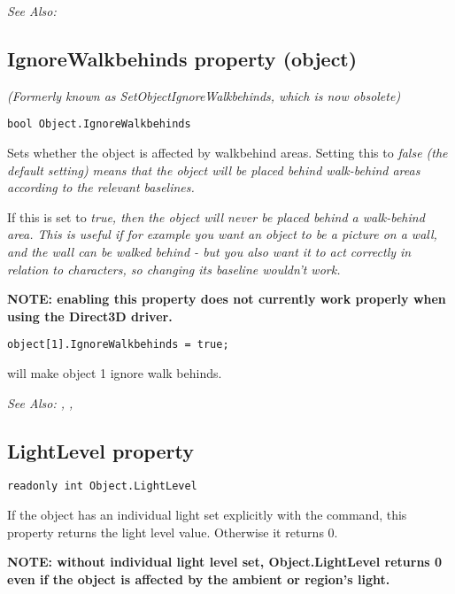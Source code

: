 \it{See Also:} 


\subsection{IgnoreWalkbehinds property (object)}\label{Object.IgnoreWalkbehinds}%

\it{(Formerly known as SetObjectIgnoreWalkbehinds, which is now obsolete)}

\begin{verbatim}
bool Object.IgnoreWalkbehinds
\end{verbatim}
Sets whether the object is affected by walkbehind areas. Setting this to \it{false}
(the default setting) means that the object will be placed behind walk-behind
areas according to the relevant baselines.

If this is set to \it{true}, then the object will never be placed behind a walk-behind
area. This is useful if for example you want an object to be a picture on
a wall, and the wall can be walked behind - but you also want it to act
correctly in relation to characters, so changing its baseline wouldn't work.

\bf{NOTE:} enabling this property does not currently work properly when using
the Direct3D driver.

\begin{verbatim}
object[1].IgnoreWalkbehinds = true;
\end{verbatim}
will make object 1 ignore walk behinds.


\it{See Also:} ,
, 


\subsection{LightLevel property}\label{Object.LightLevel}%

\begin{verbatim}
readonly int Object.LightLevel
\end{verbatim}
If the object has an individual light set explicitly with the
 command, this property returns the light level value.
Otherwise it returns 0.

\bf{NOTE:} without individual light level set, Object.LightLevel returns 0 even if the object is affected by the ambient or region's light.

